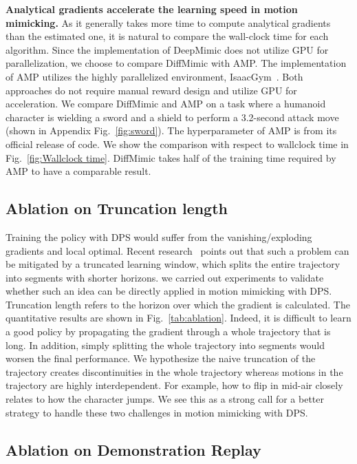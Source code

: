 \textbf{Analytical gradients accelerate the learning speed in motion mimicking.} As it generally takes more time to compute analytical gradients than the estimated one, it is natural to compare the wall-clock time for each algorithm. Since the implementation of DeepMimic does not utilize GPU for parallelization, we choose to compare DiffMimic with AMP. The implementation of AMP utilizes the highly parallelized environment, IsaacGym~\citep{makoviychuk2021isaac}. Both approaches do not require manual reward design and utilize GPU for acceleration. We compare DiffMimic and AMP on a task where a humanoid character is wielding a sword and a shield to perform a 3.2-second attack move (shown in Appendix Fig.~\ref{fig:sword}). The hyperparameter of AMP is from its official release of code.
We show the comparison with respect to wallclock time in Fig.~\ref{fig:Wallclock time}. %
DiffMimic takes half of the training time required by AMP to have a comparable result.






\subsection{Ablation on Truncation length}

Training the policy with DPS would suffer from the vanishing/exploding gradients and local optimal. Recent research~\citep{xu2022accelerated} points out that such a problem can be mitigated by a truncated learning window, which splits the entire trajectory into segments with shorter horizons. we carried out experiments to validate whether such an idea can be directly applied in motion mimicking with DPS. Truncation length refers to the horizon over which the gradient is calculated. The quantitative results are shown in Fig.~\ref{tab:ablation}. Indeed, it is difficult to learn a good policy by propagating the gradient through a whole trajectory that is long. In addition, simply splitting the whole trajectory into segments would worsen the final performance. We hypothesize the naive truncation of the trajectory creates discontinuities in the whole trajectory whereas motions in the trajectory are highly interdependent. For example, how to flip in mid-air closely relates to how the character jumps. We see this as a strong call for a better strategy to handle these two challenges in motion mimicking with DPS.
\subsection{Ablation on Demonstration Replay}

